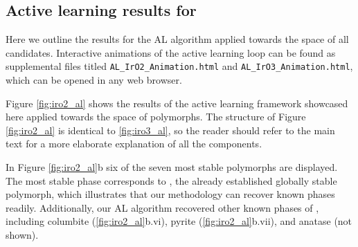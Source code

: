 \subsection{Active learning results for \IrOtwo}

%
%
Here we outline the results for the AL algorithm applied towards the space of all \IrOtwo candidates.
%
Interactive animations of the active learning loop can be found as supplemental files titled
\texttt{AL\_IrO2\_Animation.html}
and
\texttt{AL\_IrO3\_Animation.html},
which can be opened in any web browser.


%
Figure \ref{fig:iro2_al} shows the results of the active learning framework showcased here applied towards the space of \IrOtwo polymorphs.
%
The structure of Figure \ref{fig:iro2_al} is identical to \ref{fig:iro3_al}, so the reader should refer to the main text for a more elaborate explanation of all the components.
%

In Figure \ref{fig:iro2_al}b six of the seven most stable \IrOtwo polymorphs are displayed.
%
The most stable phase corresponds to \rIrOtwo, the already established globally stable \IrOtwo polymorph,
which illustrates that our methodology can recover known phases readily.
%
Additionally, our AL algorithm recovered other known phases of \IrOtwo, including columbite (\ref{fig:iro2_al}b.vi), pyrite (\ref{fig:iro2_al}b.vii), and anatase (not shown).


